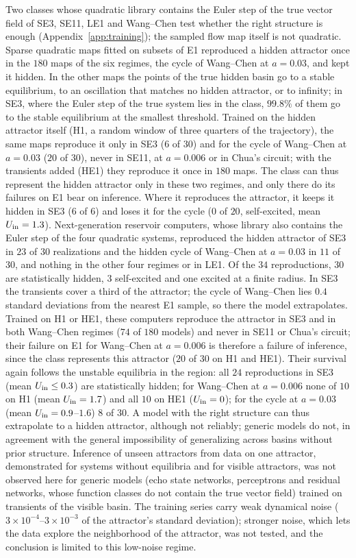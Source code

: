 Two classes whose quadratic library contains the Euler step of the true vector field of SE3, SE11, LE1 and Wang--Chen test
whether the right structure is enough (Appendix~\ref{app:training}); the sampled flow map itself is not quadratic. Sparse
quadratic maps fitted on subsets of E1 reproduced a hidden attractor once in the $180$ maps of the six regimes, the cycle
of Wang--Chen at $a=0.03$, and kept it hidden. In the other maps the points of the true hidden basin go to a
stable equilibrium, to an oscillation that matches no hidden attractor, or to infinity; in SE3, where the Euler step of the
true system lies in the class, $99.8\%$ of them go to the stable equilibrium at the smallest threshold. Trained on the
hidden attractor itself (H1, a random window of three quarters of the trajectory), the same maps reproduce it only in SE3
($6$ of $30$) and for the cycle of Wang--Chen at $a=0.03$ ($20$ of $30$), never in SE11, at $a=0.006$ or in Chua's circuit;
with the transients added (HE1) they reproduce it once in $180$ maps. The class can thus represent the hidden attractor
only in these two regimes, and only there do its failures on E1 bear on inference. Where it reproduces the attractor, it
keeps it hidden in SE3 ($6$ of $6$) and loses it for the cycle ($0$ of $20$, self-excited, mean $U_{\mathrm{in}}=1.3$).
Next-generation reservoir computers, whose library also contains the Euler step of the four quadratic systems,
reproduced the hidden attractor of SE3 in $23$ of $30$ realizations and the hidden cycle of Wang--Chen at $a=0.03$ in $11$
of $30$, and nothing in the other four regimes or in LE1. Of the $34$ reproductions, $30$ are statistically hidden, $3$ self-excited
and one excited at a finite radius. In SE3 the transients cover a third of the attractor; the cycle of Wang--Chen lies
$0.4$ standard deviations from the nearest E1 sample, so there the model extrapolates. Trained on H1 or HE1, these
computers reproduce the attractor in SE3 and in both Wang--Chen regimes ($74$ of $180$ models) and never in SE11 or Chua's
circuit; their failure on E1 for Wang--Chen at $a=0.006$ is therefore a failure of inference, since the class represents
this attractor ($20$ of $30$ on H1 and HE1). Their survival again follows the unstable equilibria in the region: all $24$
reproductions in SE3 (mean $U_{\mathrm{in}}\le0.3$) are statistically hidden; for Wang--Chen at $a=0.006$ none of $10$ on H1 (mean
$U_{\mathrm{in}}=1.7$) and all $10$ on HE1 ($U_{\mathrm{in}}=0$); for the cycle at $a=0.03$ (mean $U_{\mathrm{in}}=0.9$--$1.6$) $8$ of $30$. A model with the right structure can thus extrapolate to a hidden attractor, although not reliably;
generic models do not, in agreement with the general impossibility of generalizing across basins without prior
structure.\cite{Goring2024OOD} Inference of unseen attractors from data on one attractor, demonstrated for systems without
equilibria and for visible attractors,\cite{Rohm2021,Norton2025Unseen} was not observed here for generic models (echo state
networks, perceptrons and residual networks, whose function classes do not contain the true vector field) trained on
transients of the visible basin. The training series carry weak dynamical noise ($3\times10^{-4}$--$3\times10^{-3}$ of the
attractor's standard deviation); stronger noise, which lets the data explore the neighborhood of the attractor, was not
tested, and the conclusion is limited to this low-noise regime.
